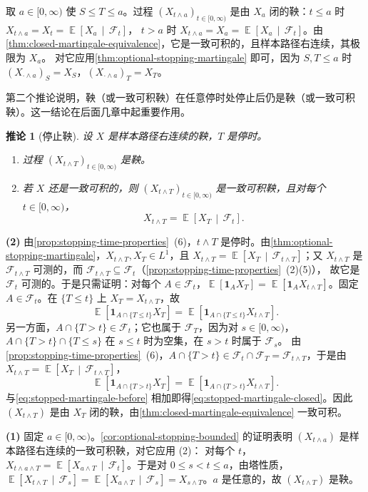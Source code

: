 \documentclass[UTF8,11pt,a4paper,oneside,fontset=fandol]{ctexrep}
\makeatletter
\numberwithin{equation}{section}
\theoremstyle{zhthm}
\newtheorem{corollary}[theorem]{推论}
\renewenvironment{proof}[1][\proofname]{\par
  \pushQED{\qed}%
  \normalfont\topsep6\p@\@plus6\p@\relax
  \trivlist
  \item[\hskip\labelsep\bfseries#1\hspace{0.5em}]\ignorespaces
}{%
  \popQED\endtrivlist\@endpefalse
}
\renewcommand{\proofname}{证明}
\newcommand{\F}{\mathcal{F}}
\DeclareMathOperator{\E}{\mathbb{E}}
\newcommand{\ind}[1]{\mathbf{1}_{#1}}
\newcommand{\Econd}[2]{%
  \E\!\left[#1\,\middle|\,#2\right]}
\makeatother
\begin{document}
\begin{proof}
取 $a\in[0,\infty)$ 使 $S\le T\le a$。过程 $(X_{t\wedge a})_{t\in[0,\infty)}$ 是由 $X_a$ 闭的鞅：$t\le a$ 时 $X_{t\wedge a}=X_t=\Econd{X_a}{\F_t}$，
$t>a$ 时 $X_{t\wedge a}=X_a=\Econd{X_a}{\F_t}$。由\cref{thm:closed-martingale-equivalence}，它是一致可积的，且样本路径右连续，其极限为 $X_a$。
对它应用\cref{thm:optional-stopping-martingale} 即可，因为 $S,T\le a$ 时 $(X_{\cdot\wedge a})_S=X_S$，$(X_{\cdot\wedge a})_T=X_T$。
\end{proof}

第二个推论说明，鞅（或一致可积鞅）在任意停时处停止后仍是鞅（或一致可积鞅）。这一结论在后面几章中起重要作用。

\begin{corollary}[停止鞅]
\label{cor:stopped-martingale}
设 $X$ 是样本路径右连续的鞅，$T$ 是停时。
\begin{enumerate}[label=(\arabic*)]
  \item 过程 $(X_{t\wedge T})_{t\in[0,\infty)}$ 是鞅。
  \item 若 $X$ 还是一致可积的，则 $(X_{t\wedge T})_{t\in[0,\infty)}$ 是一致可积鞅，且对每个 $t\in[0,\infty)$，
    \begin{equation}
      \label{eq:stopped-martingale-closed}
      X_{t\wedge T}=\Econd{X_T}{\F_t}.
    \end{equation}
\end{enumerate}
\end{corollary}

\begin{proof}
\textbf{(2)} 由\cref{prop:stopping-time-properties}~(6)，$t\wedge T$ 是停时。由\cref{thm:optional-stopping-martingale}，$X_{t\wedge T},X_T\in L^1$，且
$X_{t\wedge T}=\Econd{X_T}{\F_{t\wedge T}}$；又 $X_{t\wedge T}$ 是 $\F_{t\wedge T}$ 可测的，而 $\F_{t\wedge T}\subseteq\F_t$（\cref{prop:stopping-time-properties}~(2)(5)），
故它是 $\F_t$ 可测的。于是只需证明：对每个 $A\in\F_t$，$\E[\ind AX_T]=\E[\ind AX_{t\wedge T}]$。固定 $A\in\F_t$。在 $\{T\le t\}$ 上 $X_T=X_{t\wedge T}$，故
\begin{equation}
  \label{eq:stopped-martingale-before}
  \E[\ind{A\cap\{T\le t\}}X_T]=\E[\ind{A\cap\{T\le t\}}X_{t\wedge T}].
\end{equation}
另一方面，$A\cap\{T>t\}\in\F_t$；它也属于 $\F_T$，因为对 $s\in[0,\infty)$，$A\cap\{T>t\}\cap\{T\le s\}$ 在 $s\le t$ 时为空集，在 $s>t$ 时属于 $\F_s$。
由\cref{prop:stopping-time-properties}~(6)，$A\cap\{T>t\}\in\F_t\cap\F_T=\F_{t\wedge T}$，于是由 $X_{t\wedge T}=\Econd{X_T}{\F_{t\wedge T}}$，
\[
  \E[\ind{A\cap\{T>t\}}X_T]=\E[\ind{A\cap\{T>t\}}X_{t\wedge T}].
\]
与\cref{eq:stopped-martingale-before} 相加即得\cref{eq:stopped-martingale-closed}。因此 $(X_{t\wedge T})$ 是由 $X_T$ 闭的鞅，由\cref{thm:closed-martingale-equivalence} 一致可积。

\textbf{(1)} 固定 $a\in[0,\infty)$。\cref{cor:optional-stopping-bounded} 的证明表明 $(X_{t\wedge a})$ 是样本路径右连续的一致可积鞅，对它应用 (2)：
对每个 $t$，$X_{t\wedge a\wedge T}=\Econd{X_{a\wedge T}}{\F_t}$。于是对 $0\le s<t\le a$，由塔性质，
$\Econd{X_{t\wedge T}}{\F_s}=\Econd{X_{a\wedge T}}{\F_s}=X_{s\wedge T}$。$a$ 是任意的，故 $(X_{t\wedge T})$ 是鞅。
\end{proof}
\end{document}
